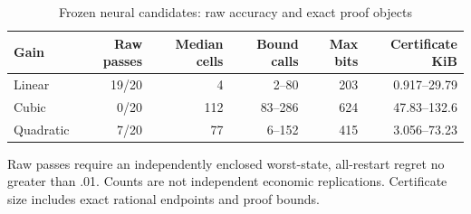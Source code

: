 \begin{table}[htbp]
\centering\footnotesize
\caption{Frozen neural candidates: raw accuracy and exact proof objects}\label{tab:summary30}
\begin{tabular}{lrrrrr}\toprule
Gain & Raw passes & Median cells & Bound calls & Max bits & Certificate KiB \\\midrule
Linear & 19/20 & 4 & 2--80 & 203 & 0.917--29.79 \\
Cubic & 0/20 & 112 & 83--286 & 624 & 47.83--132.6 \\
Quadratic & 7/20 & 77 & 6--152 & 415 & 3.056--73.23 \\
\bottomrule\end{tabular}
\par\smallskip\begin{minipage}{.98\textwidth}\footnotesize Raw passes require an independently enclosed worst-state, all-restart regret no greater than .01. Counts are not independent economic replications. Certificate size includes exact rational endpoints and proof bounds.\end{minipage}
\end{table}
